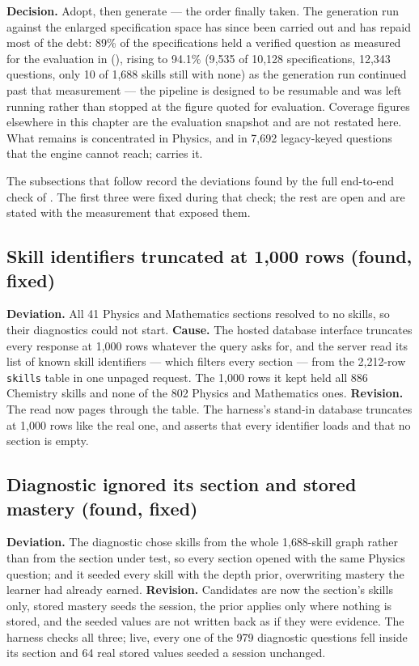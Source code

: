\textbf{Decision.} Adopt, then generate --- the order finally taken. The
generation run against the enlarged specification space has since been carried
out and has repaid most of the debt: 89\% of the specifications held a verified
question as measured for the evaluation in 
(), rising to 94.1\% (9{,}535 of 10{,}128 specifications,
12{,}343 questions, only 10 of 1{,}688 skills still with none) as the generation
run continued past that measurement --- the pipeline is designed to be resumable
and was left running rather than stopped at the figure quoted for evaluation.
Coverage figures elsewhere in this chapter are the evaluation snapshot and are
not restated here. What remains is concentrated in Physics, and in 7{,}692
legacy-keyed questions that the engine cannot reach;  carries it.

The subsections that follow record the deviations found by the full end-to-end
check of . The first three were fixed during that check; the
rest are open and are stated with the measurement that exposed them.

\subsection{Skill identifiers truncated at 1{,}000 rows (found, fixed)}
\label{sec:revisions-rowcap}

\textbf{Deviation.} All 41 Physics and Mathematics sections resolved to no
skills, so their diagnostics could not start. \textbf{Cause.} The hosted database
interface truncates every response at 1{,}000 rows whatever the query asks for,
and the server read its list of known skill identifiers --- which filters every
section --- from the 2{,}212-row \texttt{skills} table in one unpaged request. The
1{,}000 rows it kept held all 886 Chemistry skills and none of the 802 Physics and
Mathematics ones. \textbf{Revision.} The read now pages through the table. The harness's
stand-in database truncates at 1{,}000 rows like the real one, and asserts that
every identifier loads and that no section is empty.

\subsection{Diagnostic ignored its section and stored mastery (found, fixed)}
\label{sec:revisions-scope}

\textbf{Deviation.} The diagnostic chose skills from the whole 1{,}688-skill graph
rather than from the section under test, so every section opened with the same
Physics question; and it seeded every skill with the depth prior, overwriting
mastery the learner had already earned. \textbf{Revision.} Candidates are now the
section's skills only, stored mastery seeds the session, the prior applies only
where nothing is stored, and the seeded values are not written back as if they
were evidence. The harness checks all three; live, every one of the 979
diagnostic questions fell inside its section and 64 real stored values seeded a
session unchanged.

